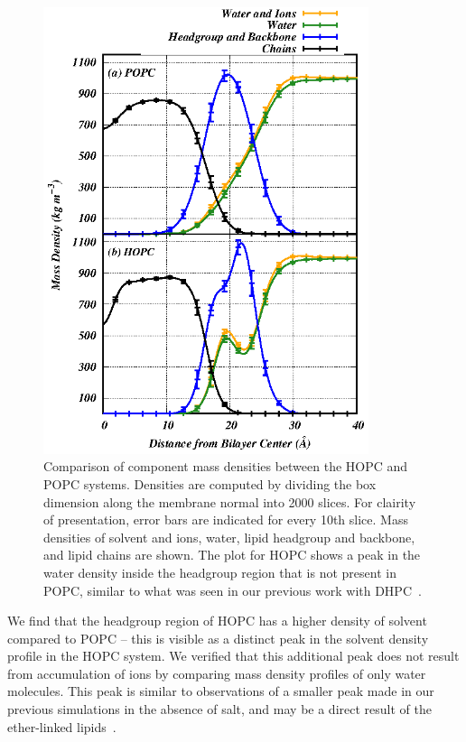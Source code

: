 \documentclass[12pt,openany,final]{book}
\begin{document}
\begin{figure}[p]
    \caption[Comparison of component mass densities between the HOPC and POPC systems.]{ 
Comparison of component mass densities between the HOPC and POPC systems. 
Densities are computed by dividing the box dimension along the membrane normal into 2000 slices. For 
clairity of presentation, error bars are indicated for every 10th slice. 
Mass densities of solvent and ions, water, lipid headgroup and backbone, and lipid chains are shown. 
The plot for HOPC shows a peak in the water density inside the headgroup region that is not present in POPC, 
similar to what was seen in our previous work with DHPC~\cite{kruczek:2017:ether}. 
}
\label{fig:massdens}
\includegraphics[width=	0.85\textwidth]{dens_3component.eps}
\end{figure}
We find that the headgroup region of 
HOPC has a higher density of solvent compared to POPC -- this is visible as 
a distinct peak in the solvent density profile in the HOPC system. 
We verified that this additional peak does not
result from accumulation of ions by comparing mass density profiles of only water molecules. This
peak is similar to observations of a smaller peak 
made in our previous simulations in the absence of salt,
and may be a direct result of the ether-linked lipids~\cite{kruczek:2017:ether}.
\end{document}
